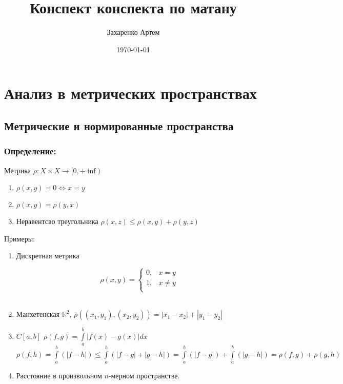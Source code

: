 \documentclass[12pt]{report} %
\author{Захаренко Артем}
\title{Конспект конспекта по матану}
\date{\today}
\begin{document}
\maketitle
\tableofcontents
\newpage
\chapter*{Анализ в метрических пространствах}

\section*{Метрические и нормированные пространства}
\subsection*{Определение:}

Метрика $\rho : X \times X \rightarrow [0, +\inf)$
\begin{enumerate}
  \setlength{\parskip}{0pt} %
  \setlength{\itemsep}{0pt} %
  \item $\rho(x, y) = 0 \Leftrightarrow x = y$
  \item $\rho(x, y) = \rho(y, x)$
  \item Неравентсво треугольника $\rho(x, z) \leqslant \rho(x, y) + \rho(y, z)$
\end{enumerate}
Примеры:
\begin{enumerate}
  \setlength{\parskip}{0pt} %
  \setlength{\itemsep}{0pt} %
  \item Дискретная метрика  
  
  \begin{equation*}
 \rho(x, y) =  
 \begin{cases}
   0, & x = y\\
   1, & x \neq y\\
 \end{cases}
\end{equation*}\\
 \item Манхетенская $\mathbb{R}^2$, $\rho((x_1, y_1), (x_2, y_2)) = |x_1 - x_2| + |y_1 - y_2|$
 \item $C[a, b]$ $\rho(f, g) = \int\limits_{a}^{b}{|f(x) - g(x)|dx}$\\
 		$\rho(f, h) = \int\limits_{a}^{b}(|f - h|) \leqslant \int\limits_{a}^{b}(|f - g| + |g - h|) =
 		\int\limits_{a}^{b}(|f - g|)  + \int\limits_{a}^{b}(|g - h|) = \rho(f, g) + \rho(g, h) $
 		
 	\item Расстояние в произвольном $n$-мерном пространстве.
\end{enumerate} 
\end{document}
